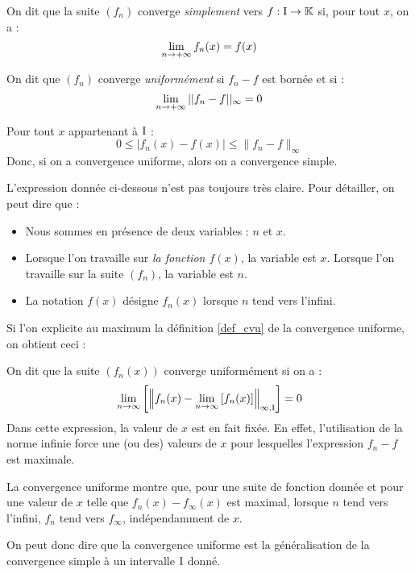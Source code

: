 \begin{defi}
On dit que la suite $(f_n)$ converge \emph{simplement} vers $f:\text{I}\to\mathbb{K}$ si, pour tout $x$, on a :
$$\lim\limits_{n\to+\infty}f_n(x)=f(x)$$
\end{defi}

\begin{defi}\label{def_cvu}
On dit que $(f_n)$ converge \emph{uniformément} si $f_n-f$ est bornée et si :
$$\lim\limits_{n\to+\infty}||f_n-f||_\infty = 0$$
\end{defi}

\begin{rem}
Pour tout $x$ appartenant à $\text{I}$ :
$$0\leq |f_n(x)-f(x)|\leq \|f_n-f\|_\infty$$
Donc, si on a convergence uniforme, alors on a convergence simple.
\end{rem}

\begin{note}
L'expression donnée ci-dessous n'est pas toujours très claire. Pour détailler, on peut dire que :
\begin{itemize}
	\item Nous sommes en présence de deux variables : $n$ et $x$.
    \item Lorsque l'on travaille sur \emph{la fonction $f(x)$}, la variable est $x$. Lorsque l'on travaille sur la suite $(f_n)$, la variable est $n$.
    \item La notation $f(x)$ désigne $f_n(x)$ lorsque $n$ tend vers l'infini.
\end{itemize}
Si l'on explicite au maximum la définition \ref{def_cvu} de la convergence uniforme, on obtient ceci :

On dit que la suite $(f_n(x))$ converge uniformément si on a :
$$\lim\limits_{n\to\infty}\left[\left\|f_n(x) - \lim\limits_{n\to\infty}\left[f_n(x)\right] \right\|_{\infty,\text{I}} \right]=0$$
Dans cette expression, la valeur de $x$ est en fait fixée. En effet, l'utilisation de la norme infinie force une (ou des) valeurs de $x$ pour lesquelles l'expression $f_n-f$ est maximale. 

La convergence uniforme montre que, pour une suite de fonction donnée et pour une valeur de $x$ telle que $f_n(x) - f_\infty(x)$ est maximal, lorsque $n$ tend vers l'infini, $f_n$ tend vers $f_\infty$, indépendamment de $x$.

On peut donc dire que la convergence uniforme est la généralisation de la convergence simple à un intervalle $\text{I}$ donné.
\end{note}

